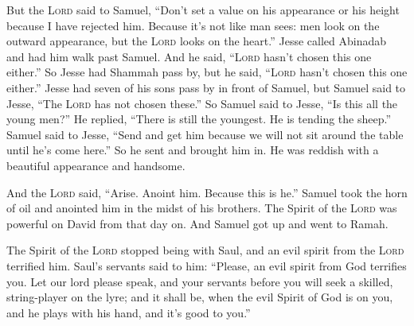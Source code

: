 \begin{inparaenum}
     But the \textsc{Lord} said to Samuel, ``Don't set a value on his appearance or his height because I have rejected him. Because it's not like man sees: men look on the outward appearance, but the \textsc{Lord} looks on the heart.''%
     Jesse called Abinadab and had him walk past Samuel. And he said, ``\textsc{Lord} hasn't chosen this one either.''%
     So Jesse had Shammah pass by, but he said, ``\textsc{Lord} hasn't chosen this one either.''%
     Jesse had seven of his sons pass by in front of Samuel, but Samuel said to Jesse, ``The \textsc{Lord} has not chosen these.''%
     So Samuel said to Jesse, ``Is this all the young men?'' He replied, ``There is still the youngest. He is tending the sheep.'' Samuel said to Jesse, ``Send and get him because we will not sit around the table until he's come here.''%
     So he sent and brought him in. He was reddish with a beautiful appearance and handsome.%
    
    And the \textsc{Lord} said, ``Arise. Anoint him. Because this is he.''%
     Samuel took the horn of oil and anointed him in the midst of his brothers. The Spirit of the \textsc{Lord} was powerful on David from that day on. And Samuel got up and went to Ramah.%
    
     The Spirit of the \textsc{Lord} stopped being with Saul, and an evil spirit from the \textsc{Lord} terrified him.%
     Saul's servants said to him: ``Please, an evil spirit from God terrifies you.%
     Let our lord please speak, and your servants before you will seek a skilled, string-player on the lyre; and it shall be, when the evil Spirit of God is on you, and he plays with his hand, and it's good to you.''%
    

\end{inparaenum}
